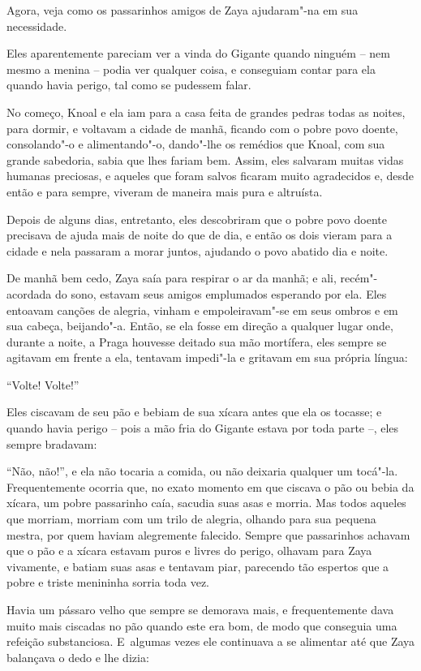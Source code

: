 Agora, veja como os passarinhos amigos de Zaya ajudaram"-na em sua
necessidade.

Eles aparentemente pareciam ver a vinda do Gigante quando ninguém -- nem mesmo a
menina -- podia ver qualquer coisa, e conseguiam contar para ela quando
havia perigo, tal como se pudessem falar.

No começo, Knoal e ela iam para a casa feita de grandes pedras todas as
noites, para dormir, e voltavam a cidade de manhã, ficando com o pobre
povo doente, consolando"-o e alimentando"-o, dando"-lhe os remédios que
Knoal, com sua grande sabedoria, sabia que lhes fariam bem. Assim, eles
salvaram muitas vidas humanas preciosas, e aqueles que foram salvos
ficaram muito agradecidos e, desde então e para sempre, viveram de
maneira mais pura e altruísta.

Depois de alguns dias, entretanto, eles descobriram que o pobre povo
doente precisava de ajuda mais de noite do que de dia, e então os dois
vieram para a cidade e nela passaram a morar juntos, ajudando o povo
abatido dia e noite.

De manhã bem cedo, Zaya saía para respirar o ar da manhã; e ali,
recém"-acordada do sono, estavam seus amigos emplumados esperando por
ela. Eles entoavam canções de alegria, vinham e empoleiravam"-se em seus
ombros e em sua cabeça, beijando"-a. Então, se ela fosse em direção a
qualquer lugar onde, durante a noite, a Praga houvesse deitado sua mão
mortífera, eles sempre se agitavam em frente a ela, tentavam impedi"-la e
gritavam em sua própria língua:

``Volte! Volte!''

Eles ciscavam de seu pão e bebiam de sua xícara antes que ela os
tocasse; e quando havia perigo -- pois a mão fria do Gigante estava por
toda parte --, eles sempre bradavam:

``Não, não!'', e ela não tocaria a comida, ou não deixaria qualquer um
tocá"-la. Frequentemente ocorria que, no exato momento em que ciscava o
pão ou bebia da xícara, um pobre passarinho caía, sacudia suas asas e
morria. Mas todos aqueles que morriam, morriam com um trilo de alegria,
olhando para sua pequena mestra, por quem haviam alegremente
falecido. Sempre que passarinhos achavam que o pão e a xícara estavam
puros e livres do perigo, olhavam para Zaya vivamente, e batiam suas
asas e tentavam piar, parecendo tão espertos que a pobre e triste
menininha sorria toda vez.

Havia um pássaro velho que sempre se demorava mais, e frequentemente
dava muito mais ciscadas no pão quando este era bom, de modo que
conseguia uma refeição substanciosa. E~algumas vezes ele continuava a se
alimentar até que Zaya balançava o dedo e lhe dizia:


